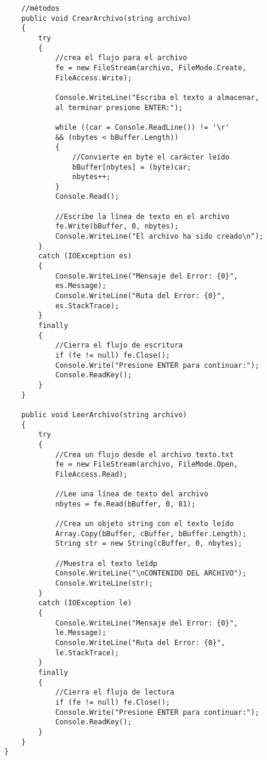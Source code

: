\documentclass[letterpaper, 12pt]{article}
\begin{document}
\begin{justify}
\begin{verbatim}
            //métodos
            public void CrearArchivo(string archivo)
            {
                try
                {
                    //crea el flujo para el archivo
                    fe = new FileStream(archivo, FileMode.Create,
                    FileAccess.Write);

                    Console.WriteLine("Escriba el texto a almacenar,
                    al terminar presione ENTER:");

                    while ((car = Console.ReadLine()) != '\r' 
                    && (nbytes < bBuffer.Length))
                    {
                        //Convierte en byte el carácter leído
                        bBuffer[nbytes] = (byte)car;
                        nbytes++;
                    }
                    Console.Read();

                    //Escribe la línea de texto en el archivo
                    fe.Write(bBuffer, 0, nbytes);
                    Console.WriteLine("El archivo ha sido creado\n");
                }
                catch (IOException es)
                {
                    Console.WriteLine("Mensaje del Error: {0}", 
                    es.Message);
                    Console.WriteLine("Ruta del Error: {0}", 
                    es.StackTrace);
                }
                finally
                {
                    //Cierra el flujo de escritura
                    if (fe != null) fe.Close();
                    Console.Write("Presione ENTER para continuar:");
                    Console.ReadKey();
                }
            }

            public void LeerArchivo(string archivo)
            {
                try
                {
                    //Crea un flujo desde el archivo texto.txt
                    fe = new FileStream(archivo, FileMode.Open,
                    FileAccess.Read);

                    //Lee una línea de texto del archivo
                    nbytes = fe.Read(bBuffer, 0, 81);

                    //Crea un objeto string con el texto leído
                    Array.Copy(bBuffer, cBuffer, bBuffer.Length);
                    String str = new String(cBuffer, 0, nbytes);

                    //Muestra el texto leídp
                    Console.WriteLine("\nCONTENIDO DEL ARCHIVO");
                    Console.WriteLine(str);
                }
                catch (IOException le)
                {
                    Console.WriteLine("Mensaje del Error: {0}", 
                    le.Message);
                    Console.WriteLine("Ruta del Error: {0}", 
                    le.StackTrace);
                }
                finally
                {
                    //Cierra el flujo de lectura
                    if (fe != null) fe.Close();
                    Console.Write("Presione ENTER para continuar:");
                    Console.ReadKey();
                }
            }
        }


\end{verbatim}
\end{justify}
\end{document}
